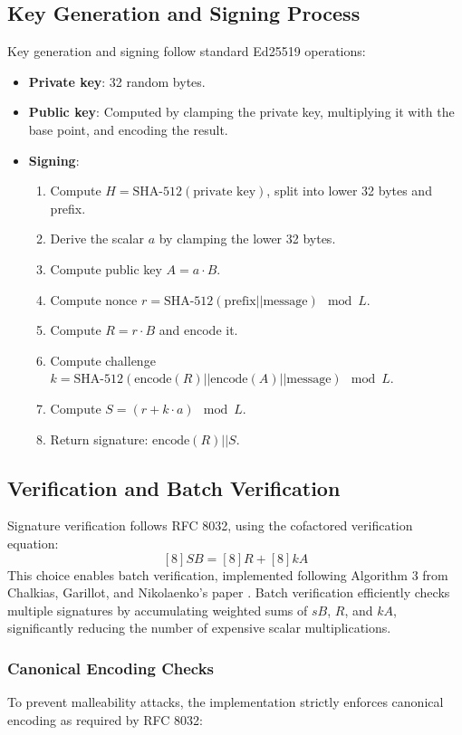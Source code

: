 \documentclass[twoside,a4paper,12pt]{article}
\begin{document}
\subsection{Key Generation and Signing Process}
Key generation and signing follow standard Ed25519 operations:

\begin{itemize}
    \item \textbf{Private key}: 32 random bytes.
    \item \textbf{Public key}: Computed by clamping the private key, multiplying it with the base point, and encoding the result.
    \item \textbf{Signing}:  
    \begin{enumerate}
        \item Compute $H = \text{SHA-512}(\text{private key})$, split into lower 32 bytes and prefix.
        \item Derive the scalar $a$ by clamping the lower 32 bytes.
        \item Compute public key $A = a \cdot B$.
        \item Compute nonce $r = \text{SHA-512}(\text{prefix} || \text{message}) \mod L$.
        \item Compute $R = r \cdot B$ and encode it.
        \item Compute challenge $k = \text{SHA-512}(\text{encode}(R) || \text{encode}(A) || \text{message}) \mod L$.
        \item Compute $S = (r + k \cdot a) \mod L$.
        \item Return signature: $\text{encode}(R) || S$.
    \end{enumerate}
\end{itemize}

\subsection{Verification and Batch Verification}
Signature verification follows RFC 8032, using the cofactored verification equation:
\[
[8] S B = [8] R + [8] k A
\]
This choice enables batch verification, implemented following Algorithm 3 from Chalkias, Garillot, and Nikolaenko's paper \cite{taming}. Batch verification efficiently checks multiple signatures by accumulating weighted sums of $sB$, $R$, and $kA$, significantly reducing the number of expensive scalar multiplications.

\subsubsection{Canonical Encoding Checks}
To prevent malleability attacks, the implementation strictly enforces canonical encoding as required by RFC 8032:
\end{document}
